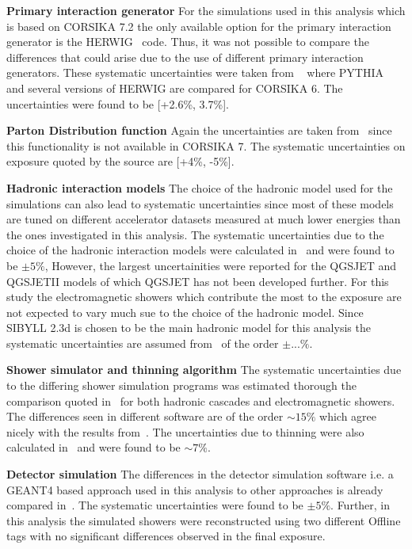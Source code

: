 \begin{description}
  \item \textbf{Primary interaction generator} For the simulations used in this analysis which is based on CORSIKA 7.2 the only available option for the primary interaction generator is the HERWIG~\cite{Corcella:2000bw} code. Thus, it was not possible to compare the differences that could arise due to the use of different primary interaction generators. These systematic uncertainties were taken from ~\cite{gap_systematics} where PYTHIA~\cite{Sjostrand:2006za} and several versions of HERWIG are compared for CORSIKA 6. The uncertainties were found to be [+2.6\%, 3.7\%]. 
  \item \textbf{Parton Distribution function} Again the uncertainties are taken from ~\cite{gap_systematics}since this functionality is not available in CORSIKA 7. The systematic uncertainties on exposure quoted by the source are [+4\%, -5\%].
  \item \textbf{Hadronic interaction models} The choice of the hadronic model used for the simulations can also lead to systematic uncertainties since most of these models are tuned on different accelerator datasets measured at much lower energies than the ones investigated in this analysis. The systematic uncertainties due to the choice of the hadronic interaction models were calculated in~\cite{gap_systematics} and were found to be $\pm 5\%$, However, the largest uncertainities were reported for the QGSJET and QGSJETII models of which QGSJET has not been developed further. For this study the electromagnetic showers which contribute the most to the exposure are not expected to vary much sue to the choice of the hadronic model. Since SIBYLL 2.3d is chosen to be the main hadronic model for this analysis the systematic uncertainties are assumed from~\cite{} of the order $\pm ...\%$.  
  \item \textbf{Shower simulator and thinning algorithm} The systematic uncertainties due to the differing shower simulation programs was estimated thorough the comparison quoted in~\cite{Huege:2022xbo} for both hadronic cascades and electromagnetic showers. The differences seen in different software are of the order $\sim 15\%$ which agree nicely with the results from~\cite{gap_systematics}. The uncertainties due to thinning were also calculated in~\cite{gap_systematics} and were found to be $\sim 7\%$.
  \item \textbf{Detector simulation} The differences in the detector simulation software i.e. a GEANT4 based approach used in this analysis to other approaches is already compared in~\cite{gap_note_det_systematics}. The systematic uncertainties were found to be $\pm 5\%$. Further, in this analysis the simulated showers were reconstructed using two different Offline tags with no significant differences observed in the final exposure. 

\end{description}
